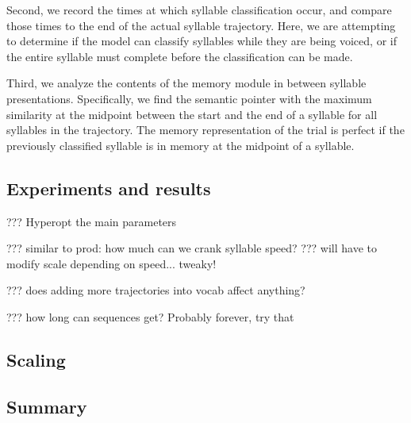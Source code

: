 Second, we record the times at which
syllable classification occur,
and compare those times
to the end of the actual syllable trajectory.
Here, we are attempting to determine
if the model can classify syllables
while they are being voiced,
or if the entire syllable must complete
before the classification can be made.

Third, we analyze the contents
of the memory module
in between syllable presentations.
Specifically,
we find the semantic pointer
with the maximum similarity
at the midpoint between
the start and the end of a syllable
for all syllables in the trajectory.
The memory representation of the trial
is perfect if the
previously classified syllable
is in memory at the midpoint
of a syllable.

\subsection{Experiments and results}

??? Hyperopt the main parameters

??? similar to prod: how much can we crank syllable speed?
??? will have to modify scale depending on speed... tweaky!

??? does adding more trajectories into vocab affect anything?

??? how long can sequences get? Probably forever, try that

\subsection{Scaling}


\subsection{Summary}

